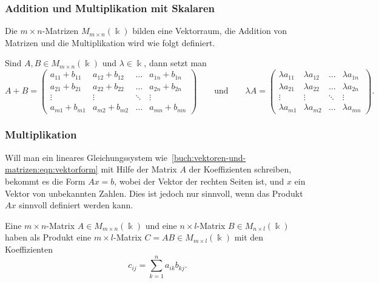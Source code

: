 \subsubsection{Addition und Multiplikation mit Skalaren}
Die $m\times n$-Matrizen $M_{m\times n}(\Bbbk)$ bilden eine Vektorraum,
die Addition von Matrizen und die Multiplikation wird wie folgt definiert.

\begin{definition}
Sind $A,B\in M_{m\times n}(\Bbbk)$ und $\lambda\in\Bbbk$, dann setzt man
\[
A+B
=
\begin{pmatrix}
a_{11}+b_{11}&a_{12}+b_{12}&\dots &a_{1n}+b_{1n}\\
a_{21}+b_{21}&a_{22}+b_{22}&\dots &a_{2n}+b_{2n}\\
\vdots       &\vdots       &\ddots&\vdots       \\
a_{m1}+b_{m1}&a_{m2}+b_{m2}&\dots &a_{mn}+b_{mn}
\end{pmatrix}
\qquad\text{und}\qquad
\lambda A
=
\begin{pmatrix}
\lambda a_{11}&\lambda a_{12}&\dots &\lambda a_{1n}\\
\lambda a_{21}&\lambda a_{22}&\dots &\lambda a_{2n}\\
\vdots        &\vdots        &\ddots&\vdots        \\
\lambda a_{m1}&\lambda a_{m2}&\dots &\lambda a_{mn}
\end{pmatrix}.
\]
\end{definition}

\subsubsection{Multiplikation}
Will man ein lineares Gleichungssystem
wie~\eqref{buch:vektoren-und-matrizen:eqn:vektorform}
mit Hilfe der Matrix $A$ der
Koeffizienten schreiben, bekommt es die Form $Ax=b$, wobei der Vektor
der rechten Seiten ist, und $x$ ein Vektor von unbekannten Zahlen.
Dies ist jedoch nur sinnvoll, wenn das Produkt $Ax$ sinnvoll definiert
werden kann.

\begin{definition}
\label{buch:vektoren-und-matrizen:def:matrixmultiplikation}
Eine $m\times n$-Matrix $A\in M_{m\times n}(\Bbbk)$ und eine
$n\times l$-Matrix $B\in M_{n\times l}(\Bbbk)$ haben als Produkt
eine $m\times l$-Matrix $C=AB\in M_{m\times l}(\Bbbk)$ mit den
Koeffizienten
\begin{equation}
c_{i\!j} = \sum_{k=1}^n a_{ik} b_{k\!j}.
\label{buch:vektoren-und-matrizen:eqn:matrixmultiplikation}
\end{equation}
\end{definition}

